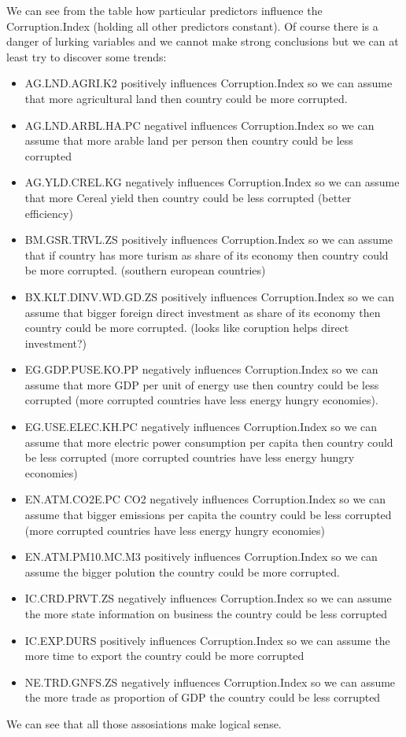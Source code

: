 \documentclass[a4paper]{article}
\begin{document}
We can see from the table how particular predictors influence the
Corruption.Index (holding all other predictors constant). Of course there is a
danger of lurking variables and we cannot make strong conclusions but we can at
least try to discover some trends:
\begin{itemize}
  \item AG.LND.AGRI.K2 positively influences Corruption.Index so we can assume
  that more agricultural land then country could be more corrupted.
  \item AG.LND.ARBL.HA.PC negativel influences Corruption.Index so we can assume
  that more arable land per person then country could be less corrupted
  \item AG.YLD.CREL.KG negatively influences Corruption.Index so we can assume
  that more Cereal yield then country could be less corrupted (better
  efficiency)
  \item BM.GSR.TRVL.ZS positively influences Corruption.Index so we can assume
  that if country has more turism as share of its economy then country could be
  more corrupted. (southern european countries)
  \item BX.KLT.DINV.WD.GD.ZS positively influences Corruption.Index so we can assume
  that bigger foreign direct investment as share of its economy then country
  could be more corrupted. (looks like coruption helps direct investment?)
  \item EG.GDP.PUSE.KO.PP negatively influences Corruption.Index so we can
  assume that more GDP per unit of energy use then country could be less corrupted 
  (more corrupted countries have less energy hungry economies).
  \item EG.USE.ELEC.KH.PC negatively influences Corruption.Index so we can
  assume that more electric power consumption per capita then country could be less
  corrupted (more corrupted countries have less energy hungry economies)
  \item EN.ATM.CO2E.PC CO2 negatively influences Corruption.Index so we can
  assume that bigger emissions per capita the country could be less corrupted 
  (more corrupted countries have less energy hungry economies)
  \item EN.ATM.PM10.MC.M3 positively influences Corruption.Index so we can assume
  the bigger polution the country could be more corrupted.
  \item IC.CRD.PRVT.ZS negatively influences Corruption.Index so we can
  assume the more state information on business the country could be less corrupted 
  \item IC.EXP.DURS positively influences Corruption.Index so we can assume the
  more time to export the country could be more corrupted 
  \item NE.TRD.GNFS.ZS negatively influences Corruption.Index so we can assume
  the more trade as proportion of GDP the country could be less corrupted
\end{itemize}
We can see that all those assosiations make logical sense.
\end{document}
